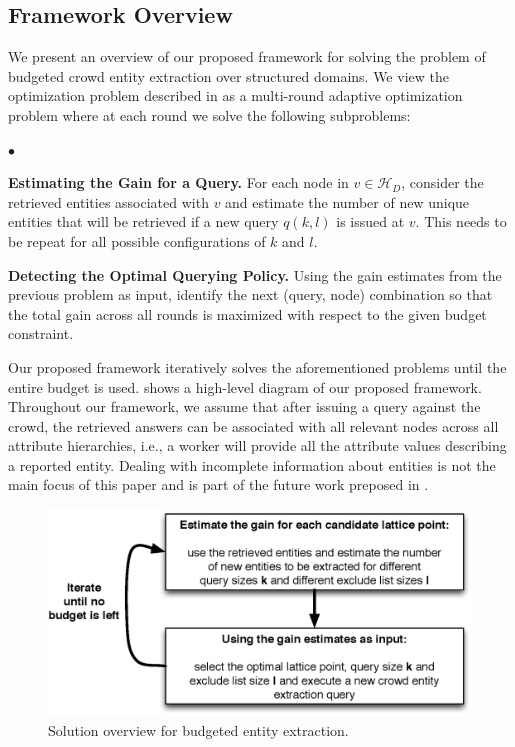 \documentclass{vldb}
\newcommand{\squishlist}{
   \begin{list}{$\bullet$}
    {
      \setlength{\itemsep}{0pt}
      \setlength{\parsep}{3pt}
      \setlength{\topsep}{3pt}
      \setlength{\partopsep}{0pt}
      \setlength{\leftmargin}{1.5em}
      \setlength{\labelwidth}{1em}
      \setlength{\labelsep}{0.5em} } }
\newcommand{\squishend}{
    \end{list}  }
\newcommand{\hierarchy}{\mathcal{H}_D}
\begin{document}
\subsection{Framework Overview}
\label{sec:framework}
We present an overview of our proposed framework for solving the problem of budgeted crowd entity extraction over structured domains. We view the optimization problem described in  as a multi-round adaptive optimization problem where at each round we solve the following subproblems: 
\squishlist 
\item \textbf{Estimating the Gain for a Query.} For each node in $v \in \hierarchy$, consider the retrieved entities associated with $v$ and estimate the number of new unique entities that will be retrieved if a new query $q(k,l)$ is issued at $v$. This needs to be repeat for all possible configurations of $k$ and $l$.
\item \textbf{Detecting the Optimal Querying Policy.} Using the gain estimates from the previous problem as input, identify the next (query, node) combination so that the total gain across all rounds is maximized with respect to the given budget constraint. 
\squishend
Our proposed framework iteratively solves the aforementioned problems until the entire budget is used.  shows a high-level diagram of our proposed framework. Throughout our framework, we assume that after issuing a query against the crowd, the retrieved answers can be associated with all relevant nodes across all attribute hierarchies, i.e., a worker will provide all the attribute values describing a reported entity. Dealing with incomplete information about entities is not the main focus of this paper and is part of the future work preposed in .

\begin{figure}
	\begin{center}
	\includegraphics[clip,scale=0.45]{figs/framework.eps}
	\caption{Solution overview for budgeted entity extraction.}
	\label{fig:framework}
	\end{center}
	\vspace{-10pt}
\end{figure}
\end{document}
